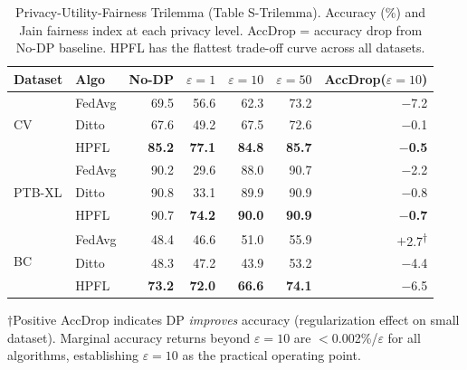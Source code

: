 \documentclass[conference,a4paper]{IEEEtran}
\begin{document}
\begin{table}[!ht]
\centering
\caption{Privacy-Utility-Fairness Trilemma (Table S-Trilemma). Accuracy (\%) and Jain fairness index at each privacy level. AccDrop = accuracy drop from No-DP baseline. HPFL has the flattest trade-off curve across all datasets.}
\label{tab:s_trilemma}
\scriptsize
\begin{tabular}{llrrrrr}
\toprule
\textbf{Dataset} & \textbf{Algo} & \textbf{No-DP} & \textbf{$\varepsilon{=}1$} & \textbf{$\varepsilon{=}10$} & \textbf{$\varepsilon{=}50$} & \textbf{AccDrop($\varepsilon{=}10$)} \\
\midrule
\multirow{3}{*}{CV} & FedAvg & 69.5 & 56.6 & 62.3 & 73.2 & $-$7.2 \\
 & Ditto & 67.6 & 49.2 & 67.5 & 72.6 & $-$0.1 \\
 & HPFL & \textbf{85.2} & \textbf{77.1} & \textbf{84.8} & \textbf{85.7} & \textbf{$-$0.5} \\
\midrule
\multirow{3}{*}{PTB-XL} & FedAvg & 90.2 & 29.6 & 88.0 & 90.7 & $-$2.2 \\
 & Ditto & 90.8 & 33.1 & 89.9 & 90.9 & $-$0.8 \\
 & HPFL & 90.7 & \textbf{74.2} & \textbf{90.0} & \textbf{90.9} & \textbf{$-$0.7} \\
\midrule
\multirow{3}{*}{BC} & FedAvg & 48.4 & 46.6 & 51.0 & 55.9 & $+$2.7\textsuperscript{$\dagger$} \\
 & Ditto & 48.3 & 47.2 & 43.9 & 53.2 & $-$4.4 \\
 & HPFL & \textbf{73.2} & \textbf{72.0} & \textbf{66.6} & \textbf{74.1} & $-$6.5 \\
\bottomrule
\end{tabular}

\vspace{1mm}
\footnotesize{$\dagger$Positive AccDrop indicates DP \textit{improves} accuracy (regularization effect on small dataset). Marginal accuracy returns beyond $\varepsilon{=}10$ are $<$0.002\%/$\varepsilon$ for all algorithms, establishing $\varepsilon{=}10$ as the practical operating point.}
\end{table}
\end{document}
